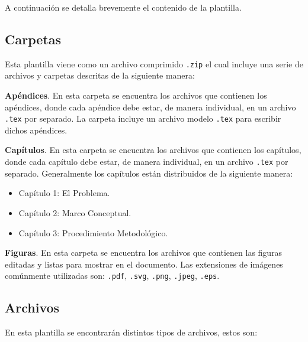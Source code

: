 A continuaci\'{o}n se detalla brevemente el contenido de la plantilla.

\subsection{Carpetas}

Esta plantilla viene como un archivo comprimido \texttt{.zip} el cual incluye una serie de archivos y carpetas descritas de la siguiente manera:

\textbf{Apéndices}. En esta carpeta se encuentra los archivos que contienen los apéndices, donde cada apéndice debe estar, de manera individual, en un archivo \texttt{.tex} por separado. La carpeta incluye un archivo modelo \texttt{.tex} para escribir dichos apéndices.

\textbf{Cap\'{i}tulos}. En esta carpeta se encuentra los archivos que contienen los cap\'{i}tulos,  donde cada cap\'{i}tulo debe estar, de manera individual, en un archivo \texttt{.tex} por separado. Generalmente los cap\'{i}tulos est\'{a}n distribuidos de la siguiente manera:

\begin{itemize}
\item Cap\'{i}tulo 1: El Problema.
\item Cap\'{i}tulo 2: Marco Conceptual.
\item Cap\'{i}tulo 3: Procedimiento Metodológico.
\end{itemize}
 
\textbf{Figuras}. En esta carpeta se encuentra los archivos que contienen las figuras editadas y listas para mostrar en el documento. Las extensiones de imágenes comúnmente utilizadas son: \texttt{.pdf}, \texttt{.svg}, \texttt{.png}, \texttt{.jpeg}, \texttt{.eps}.

\subsection{Archivos}

En esta plantilla se encontrar\'{a}n distintos tipos de archivos, estos son:

